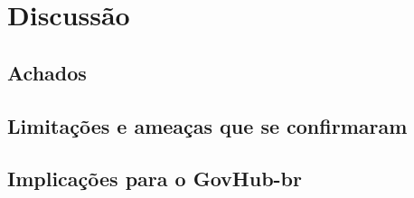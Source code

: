 \chapter{Discussão}
\label{chap:discussao}


\section{Achados}
\label{sec:discussao-achados}

\section{Limitações e ameaças que se confirmaram}
\label{sec:discussao-limitacoes-e-ameacas-que-se-confirmaram}

\section{Implicações para o GovHub-br}
\label{sec:discussao-implicacoes-para-o-govhub-br}
